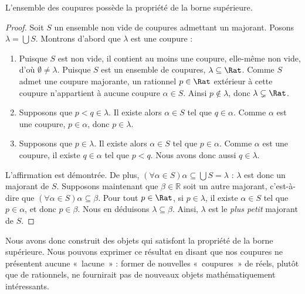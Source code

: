 \documentclass[../../../include/open-logic-section]{subfiles}
\begin{document}
\begin{thm}
L'ensemble des coupures possède la propriété de la borne supérieure.
\end{thm}

\begin{proof}
Soit $S$ un ensemble non vide de coupures admettant un majorant. Posons
$\lambda = \bigcup S$.
Montrons d'abord que $\lambda$ est une coupure :
\begin{enumerate}
\item Puisque $S$ est non vide, il contient au moins une coupure, elle-même
non vide, d'où $\emptyset \neq \lambda$.
Puisque $S$ est un ensemble de coupures, $\lambda \subseteq \Rat$.
Comme $S$ admet une coupure majorante, un rationnel $p \in \Rat$
extérieur à cette coupure n'appartient à aucune coupure $\alpha \in S$.
Ainsi $p\notin \lambda$, donc $\lambda \subsetneq \Rat$.
\item Supposons que $p < q \in \lambda$. Il existe alors $\alpha \in S$
tel que $q \in \alpha$. Comme $\alpha$ est une coupure, $p \in \alpha$,
donc $p \in \lambda$.
\item Supposons que $p \in \lambda$. Il existe alors $\alpha \in S$
tel que $p \in \alpha$. Comme $\alpha$ est une coupure, il existe
$q \in \alpha$ tel que $p < q$. Nous avons donc aussi $q \in \lambda$.
\end{enumerate}
L'affirmation est démontrée. De plus,
$(\forall \alpha \in S)\alpha \subseteq \bigcup S = \lambda$ :
$\lambda$ est donc un majorant de $S$. Supposons maintenant que
$\beta \in \mathbb{R}$ soit un autre majorant, c'est-à-dire que
$(\forall \alpha \in S)\alpha \subseteq \beta$. Pour tout $p \in \Rat$,
si $p \in \lambda$, il existe $\alpha \in S$ tel que $p \in \alpha$,
et donc $p \in \beta$. Nous en déduisons $\lambda \subseteq \beta$.
Ainsi, $\lambda$ est le \emph{plus petit} majorant de $S$.
\end{proof}

Nous avons donc construit des objets qui satisfont la propriété de la
borne supérieure. Nous pouvons exprimer ce résultat en disant que nos
coupures ne présentent aucune «~lacune~» : former de nouvelles
«~coupures~» de réels, plutôt que de rationnels, ne fournirait pas
de nouveaux objets mathématiquement intéressants.
\end{document}
